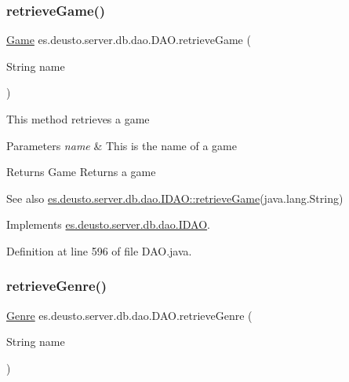 \subsubsection{\texorpdfstring{retrieve\+Game()}{retrieveGame()}}
{\footnotesize\ttfamily \hyperlink{classes_1_1deusto_1_1server_1_1db_1_1data_1_1_game}{Game} es.\+deusto.\+server.\+db.\+dao.\+D\+A\+O.\+retrieve\+Game (\begin{DoxyParamCaption}\item[{String}]{name }\end{DoxyParamCaption})}

This method retrieves a game 
\begin{DoxyParams}{Parameters}
{\em name} & This is the name of a game \\
\hline
\end{DoxyParams}
\begin{DoxyReturn}{Returns}
Game Returns a game 
\end{DoxyReturn}
\begin{DoxySeeAlso}{See also}
\hyperlink{interfacees_1_1deusto_1_1server_1_1db_1_1dao_1_1_i_d_a_o_a30558c19c086ac0ffff6796a8ae208fb}{es.\+deusto.\+server.\+db.\+dao.\+I\+D\+A\+O\+::retrieve\+Game}(java.\+lang.\+String) 
\end{DoxySeeAlso}


Implements \hyperlink{interfacees_1_1deusto_1_1server_1_1db_1_1dao_1_1_i_d_a_o_a30558c19c086ac0ffff6796a8ae208fb}{es.\+deusto.\+server.\+db.\+dao.\+I\+D\+AO}.



Definition at line 596 of file D\+A\+O.\+java.

\mbox{\label{classes_1_1deusto_1_1server_1_1db_1_1dao_1_1_d_a_o_a16b0af798fbb00cd29a505491c57e2cd}} 
\subsubsection{\texorpdfstring{retrieve\+Genre()}{retrieveGenre()}}
{\footnotesize\ttfamily \hyperlink{classes_1_1deusto_1_1server_1_1db_1_1data_1_1_genre}{Genre} es.\+deusto.\+server.\+db.\+dao.\+D\+A\+O.\+retrieve\+Genre (\begin{DoxyParamCaption}\item[{String}]{name }\end{DoxyParamCaption})}

